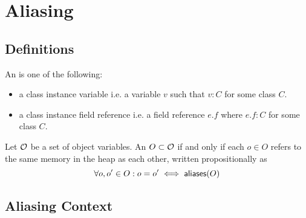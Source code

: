 \section{Aliasing}

\subsection{Definitions}

An  is one of the following:
\begin{itemize}
  \item a class instance variable i.e. a variable $v$ such that $v : C$ for some class $C$.
  \item a class instance field reference i.e. a field reference $e.f$ where $e.f : C$ for some class $C$.
\end{itemize}
Let $\mathcal{O}$ be a set of object variables.
An $O \subset \mathcal{O}$  if and only if
each $o \in O$ refers to the same memory in the heap as each other,
written propositionally as
$$
  \forall o, o^\prime \in O : o = o^\prime \iff \textsf{aliases}(O)
$$

\subsection{Aliasing Context}

